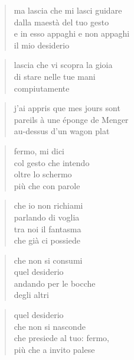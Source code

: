 	\begin{verse}
		ma lascia che mi lasci guidare\\
		dalla maestà del tuo gesto\\
		e in esso appaghi e non appaghi\\
		il mio desiderio
	\end{verse}

	\begin{verse}
		lascia che vi scopra la gioia\\
		di stare nelle tue mani\\
		compiutamente
	\end{verse}

\clearpage


	\begin{verse}
		j'ai appris que mes jours sont\\
		pareils à une éponge de Menger\\
		au-dessus d'un wagon plat
	\end{verse}

\clearpage


	\begin{verse}
		fermo, mi dici\\
		col gesto che intendo\\
		oltre lo schermo\\
		più che con parole
	\end{verse}

	\begin{verse}
		che io non richiami\\
		parlando di voglia\\
		tra noi il fantasma\\
		che già ci possiede
	\end{verse}

	\begin{verse}
		che non si consumi\\
		quel desiderio\\
		andando per le bocche\\
		degli altri
	\end{verse}

	\begin{verse}
		quel desiderio \\
		che non si nasconde\\
		che presiede al tuo: fermo,\\
		più che a invito palese
	\end{verse}

